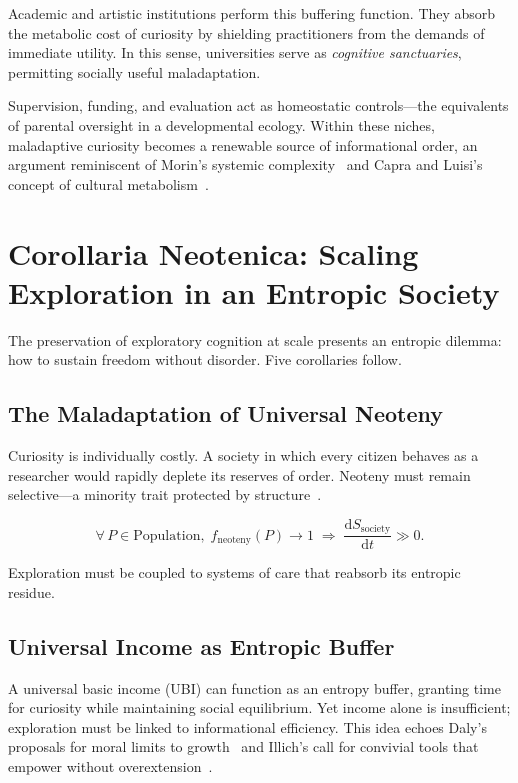 \documentclass[12pt,a4paper]{article}
\theoremstyle{definition}
\newcommand{\ddt}[1]{\frac{\mathrm{d}#1}{\mathrm{d}t}}
\begin{document}
Academic and artistic institutions perform this buffering function.  They absorb
the metabolic cost of curiosity by shielding practitioners from the demands of
immediate utility.  In this sense, universities serve as \emph{cognitive
sanctuaries}, permitting socially useful maladaptation.

Supervision, funding, and evaluation act as homeostatic controls---the
equivalents of parental oversight in a developmental ecology.  Within these
niches, maladaptive curiosity becomes a renewable source of informational order,
an argument reminiscent of Morin's systemic complexity~\citep{morin2008} and
Capra and Luisi's concept of cultural
metabolism~\citep{capraluisi2021}.

\section{Corollaria Neotenica: Scaling Exploration in an Entropic Society}

The preservation of exploratory cognition at scale presents an entropic dilemma:
how to sustain freedom without disorder.  Five corollaries follow.

\subsection{The Maladaptation of Universal Neoteny}

Curiosity is individually costly.  A society in which every citizen behaves as a
researcher would rapidly deplete its reserves of order.  Neoteny must remain
selective---a minority trait protected by structure~\citep{georgesuroegen1971}.

\begin{equation}
  \forall\, P \in \mathrm{Population},\;
  f_{\mathrm{neoteny}}(P) \to 1
  \;\Longrightarrow\;
  \ddt{S_{\mathrm{society}}} \gg 0.
\end{equation}

Exploration must be coupled to systems of care that reabsorb its entropic
residue.

\subsection{Universal Income as Entropic Buffer}

A universal basic income (UBI) can function as an entropy buffer, granting time
for curiosity while maintaining social equilibrium.  Yet income alone is
insufficient; exploration must be linked to informational efficiency.  This idea
echoes Daly's proposals for moral limits to
growth~\citep{daly1977,daly2020} and Illich's call for convivial tools that
empower without overextension~\citep{illich1973}.
\end{document}
